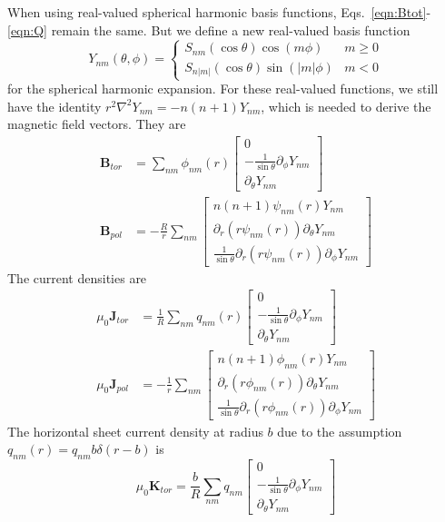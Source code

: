 \documentclass{article}
\newcommand{\B}{\mathbf{B}}
\newcommand{\J}{\mathbf{J}}
\begin{document}
When using real-valued spherical harmonic basis functions, Eqs.~\eqref{eqn:Btot}-\eqref{eqn:Q}
remain the same. But we define a new real-valued basis function
\begin{equation}
Y_{nm}(\theta,\phi) = \left\{
\begin{array}{cc}
S_{nm}(\cos{\theta}) \cos{(m \phi)} & m \ge 0 \\
S_{n|m|}(\cos{\theta}) \sin{(|m| \phi)} & m < 0
\end{array}
\right.
\end{equation}
for the spherical harmonic expansion. For these real-valued functions, we still
have the identity $r^2 \nabla^2 Y_{nm} = -n(n+1) Y_{nm}$, which is needed to
derive the magnetic field vectors. They are
\begin{align}
\B_{tor} &= \sum_{nm} \phi_{nm}(r)
\left[
\begin{array}{c}
0 \\
-\frac{1}{\sin{\theta}} \partial_{\phi} Y_{nm} \\
\partial_{\theta} Y_{nm}
\end{array}
\right] \\
\B_{pol} &= -\frac{R}{r} \sum_{nm}
\left[
\begin{array}{c}
n(n+1) \psi_{nm}(r) Y_{nm} \\
\partial_r \left( r \psi_{nm}(r) \right) \partial_{\theta} Y_{nm} \\
\frac{1}{\sin{\theta}} \partial_r \left( r \psi_{nm}(r) \right) \partial_{\phi} Y_{nm}
\end{array}
\right]
\end{align}
The current densities are
\begin{align}
\mu_0 \J_{tor} &= \frac{1}{R} \sum_{nm} q_{nm}(r)
\left[
\begin{array}{c}
0 \\
-\frac{1}{\sin{\theta}} \partial_{\phi} Y_{nm} \\
\partial_{\theta} Y_{nm}
\end{array}
\right] \\
\mu_0 \J_{pol} &= -\frac{1}{r} \sum_{nm}
\left[
\begin{array}{c}
n(n+1) \phi_{nm}(r) Y_{nm} \\
\partial_r \left( r \phi_{nm}(r) \right) \partial_{\theta} Y_{nm} \\
\frac{1}{\sin{\theta}} \partial_r \left( r \phi_{nm}(r) \right) \partial_{\phi} Y_{nm}
\end{array}
\right]
\end{align}
The horizontal sheet current density at radius $b$ due to the assumption
$q_{nm}(r) = q_{nm} b \delta(r - b)$ is
\begin{equation}
\mu_0 \mathbf{K}_{tor} = \frac{b}{R} \sum_{nm} q_{nm}
\left[
\begin{array}{c}
0 \\
-\frac{1}{\sin{\theta}} \partial_{\phi} Y_{nm} \\
\partial_{\theta} Y_{nm}
\end{array}
\right]
\end{equation}
\end{document}
